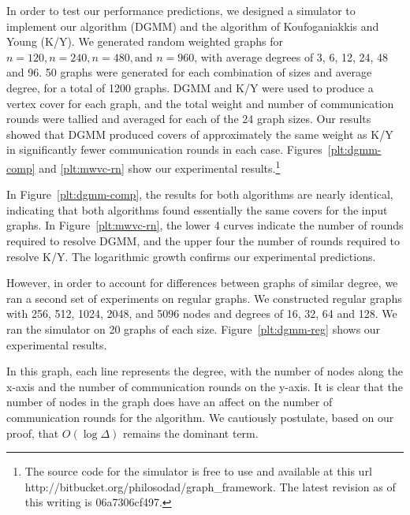 \label{sec:vertex-experiment}
In order to test our performance predictions, we designed a simulator to implement our algorithm (DGMM) and the algorithm of Koufoganiakkis and Young (K/Y). We generated random weighted graphs for $n=120, n=240, n=480, \text{and } n=960$, with average degrees of 3, 6, 12, 24, 48 and 96. 50 graphs were generated for each combination of sizes and average degree, for a total of 1200 graphs. DGMM and K/Y were used to produce a vertex cover for each graph, and the total weight and number of communication rounds were tallied and averaged for each of the 24 graph sizes. Our results showed that DGMM produced covers of approximately the same weight as K/Y in significantly fewer communication rounds in each case. Figures~\ref{plt:dgmm-comp} and \ref{plt:mwvc-rn} show our experimental results.\footnote{The source code for the simulator is free to use and available at this url http://bitbucket.org/philosodad/graph\_framework. The latest revision as of this writing is 06a7306cf497.}




In Figure~\ref{plt:dgmm-comp}, the results for both algorithms are nearly identical, indicating that both algorithms found essentially the same covers for the input graphs. In Figure~\ref{plt:mwvc-rn}, the lower 4 curves indicate the number of rounds required to resolve DGMM, and the upper four the number of rounds required to resolve K/Y. The logarithmic growth confirms our experimental predictions. 

However, in order to account for differences between graphs of similar degree, we ran a second set of experiments on regular graphs. We constructed regular graphs with 256, 512, 1024, 2048, and 5096 nodes and degrees of 16, 32, 64 and 128. We ran the simulator on 20 graphs of each size. Figure~\ref{plt:dgmm-reg} shows our experimental results.



In this graph, each line represents the degree, with the number of nodes along the x-axis and the number of communication rounds on the y-axis. It is clear that the number of nodes in the graph does have an affect on the number of communication rounds for the algorithm. We cautiously postulate, based on our proof, that $O(\log{\Delta})$ remains the dominant term. 
